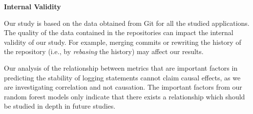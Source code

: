 \noindent \textbf{Internal Validity}

Our study is based on the data obtained from Git for all the studied applications. The quality of the data contained in the repositories can impact the internal validity of our study. For example, merging commits or rewriting the history of the repository (i.e., by \emph{rebasing} the history) may affect our results.  

Our analysis of the relationship between metrics that are important factors in predicting the stability of logging statements cannot claim causal effects, as we are investigating correlation and not causation. The important factors from our random forest models only indicate that there exists a relationship which should be studied in depth in future studies. 



